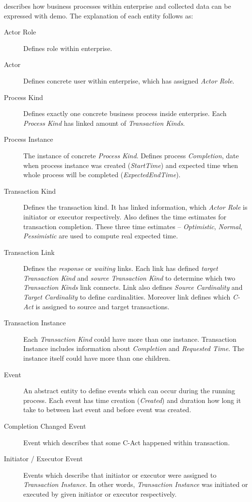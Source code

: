  describes how business processes within enterprise and collected data can be expressed with \gls{demo}. The explanation of each entity follows as:
\begin{description}
\item[Actor Role] Defines role within enterprise. 
\item[Actor] Defines concrete user within enterprise, which has assigned \textit{Actor Role}.

\item[Process Kind] Defines exactly one concrete business process inside enterprise. Each \textit{Process Kind} has linked amount of \textit{Transaction Kinds}.

\item[Process Instance] The instance of concrete \textit{Process Kind}. Defines process \textit{Completion}, date when process instance was created (\textit{StartTime}) and expected time when whole process will be completed (\textit{ExpectedEndTime}).

\item[Transaction Kind] Defines the transaction kind. It has linked information, which \textit{Actor Role} is initiator or executor respectively. Also defines the time estimates for transaction completion. These three time estimates -- \textit{Optimistic}, \textit{Normal}, \textit{Pessimistic} are used to compute real expected time. 

\item[Transaction Link] Defines the \textit{response} or \textit{waiting} links. Each link has defined \textit{target Transaction Kind}  and \textit{source Transaction Kind} to determine which two \textit{Transaction Kinds} link connects. Link also defines \textit{Source Cardinality} and \textit{Target Cardinality} to define cardinalities. Moreover link defines which \textit{C-Act} is assigned to source and target transactions.  

\item[Transaction Instance] Each \textit{Transaction Kind} could have more than one instance. Transaction Instance includes information about \textit{Completion} and \textit{Requested Time}. The instance itself could have more than one children. 

\item[Event] An abstract entity to define events which can occur during the running process. Each event has time creation (\textit{Created}) and duration how long it take to between last event and before event was created.

\item[Completion Changed Event] Event which describes that some C-Act happened within transaction. 
\item[Initiator / Executor Event] Events which describe that initiator or executor were assigned to \textit{Transaction Instance}. In other words, \textit{Transaction Instance} was initiated or executed by given initiator or executor respectively.
\end{description}

